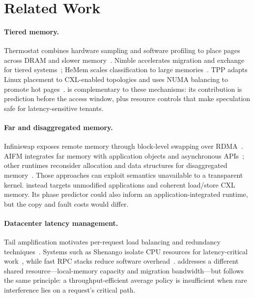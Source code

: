 \section{Related Work}
\label{sec:related}

\paragraph{Tiered memory.}
Thermostat combines hardware sampling and software profiling to place pages
across DRAM and slower memory~\cite{agarwal2017thermostat}.  Nimble accelerates
migration and exchange for tiered systems~\cite{yan2019nimble}; HeMem scales
classification to large memories~\cite{raybuck2021hemem}.  TPP adapts Linux
placement to CXL-enabled topologies and uses NUMA balancing to promote hot
pages~\cite{maruf2023tpp}.  \system is complementary to these mechanisms: its
contribution is prediction before the access window, plus resource controls
that make speculation safe for latency-sensitive tenants.

\paragraph{Far and disaggregated memory.}
Infiniswap exposes remote memory through block-level swapping over
RDMA~\cite{guo2017infiniswap}.  AIFM integrates far memory with application
objects and asynchronous APIs~\cite{ruan2020aifm}; other runtimes reconsider
allocation and data structures for disaggregated memory~\cite{calciu2021ribbon}.
Those approaches can exploit semantics unavailable to a transparent kernel.
\system instead targets unmodified applications and coherent load/store CXL
memory.  Its phase predictor could also inform an application-integrated
runtime, but the copy and fault costs would differ.

\paragraph{Datacenter latency management.}
Tail amplification motivates per-request load balancing and redundancy
techniques~\cite{dean2013tail}.  Systems such as Shenango isolate CPU resources
for latency-critical work~\cite{ousterhout2019shenango}, while fast RPC stacks
reduce software overhead~\cite{kalia2019erpc}.  \system addresses a different
shared resource---local-memory capacity and migration bandwidth---but follows
the same principle: a throughput-efficient average policy is insufficient when
rare interference lies on a request's critical path.
